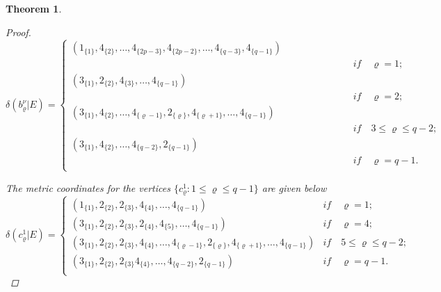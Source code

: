 \documentclass[]{interact}
\theoremstyle{plain}%
\newtheorem{theorem}{Theorem}[section]
\theoremstyle{definition}
\theoremstyle{remark}
\begin{document}
\begin{theorem}
\begin{proof}
                        \begin{equation*}
                        \delta(b^{\nu}_{\varrho}|E)=
                   \begin{cases}
                   (1_{\{1\}},4_{\{2\}},\ldots, 4_{\{2p-3 \}},4_{\{2p-2 \}}, \ldots,4_{\{q-3\}},4_{\{q-1\}})\\
\qquad  \qquad \qquad \qquad \qquad \qquad \qquad \qquad \qquad \qquad  \qquad \qquad\qquad\qquad\quad\textit{if}\quad\varrho= 1;\\
                   (3_{\{1\}},2_{\{ 2\}},4_{\{3\}}, \ldots,4_{\{q-1\}})\\
\qquad  \qquad \qquad \qquad \qquad \qquad \qquad \qquad \qquad \qquad  \qquad \qquad\qquad\qquad\quad\textit{if}\quad    \varrho =2;\\
                   (3_{\{1\}},4_{\{2\}}, \ldots,4_{\{\varrho-1\}},2_{\{ \varrho\}},4_{\{\varrho +1\}}, \ldots,4_{\{q-1\}})\\
\qquad  \qquad \qquad \qquad \qquad \qquad \qquad \qquad \qquad \qquad  \qquad \qquad\qquad\qquad\quad\textit{if}\quad  3 \leq  \varrho  \leq q-2  ;\\
                      (3_{\{1\}},4_{\{2\}},\ldots,4_{\{q-2\}},2_{\{q-1\}})\\
\qquad  \qquad \qquad \qquad \qquad \qquad \qquad \qquad \qquad \qquad  \qquad \qquad\qquad\qquad\quad\textit{if}\quad   \varrho= q-1  .\\
                    \end{cases}
                    \end{equation*}

\noindent The metric coordinates for the vertices 
                     $\{c^1_\varrho: 1\leq \varrho\leq q-1 \}$ are given below
                        \begin{equation*}
                        \delta(c^{1}_{\varrho}|E)=
                   \begin{cases}
                   (1_{\{1\}},2_{\{2\}},2_{\{3\}},4_{\{4\}},\ldots,4_{\{q-1\}})&\textit{if}\quad\varrho= 1;\\
                     (3_{\{1\}},2_{\{2\}}, 2_{\{3 \}},2_{\{ 4 \}}, 4_{\{ 5 \}},\ldots,4_{\{q-1\}})&\textit{if}\quad \varrho= 4;\\
                     (3_{\{1\}},2_{\{2\}}, 2_{\{3 \}},4_{\{ 4 \}}, \ldots, 4_{\{\varrho-1 \}},2_{\{\varrho \}}, 4_{\{\varrho+1 \}},\ldots,4_{\{q-1\}})&\textit{if}\quad  5 \leq  \varrho  \leq q-2  ;\\
                     (3_{\{1\}},2_{\{2\}},2_{\{3\}} 4_{\{4\}},\ldots, 4_{\{q-2\}},2_{\{q-1\}}) &\textit{if}\quad\varrho= q-1.\\
                \end{cases}
                    \end{equation*}


\end{proof}
\end{theorem}
\end{document}
